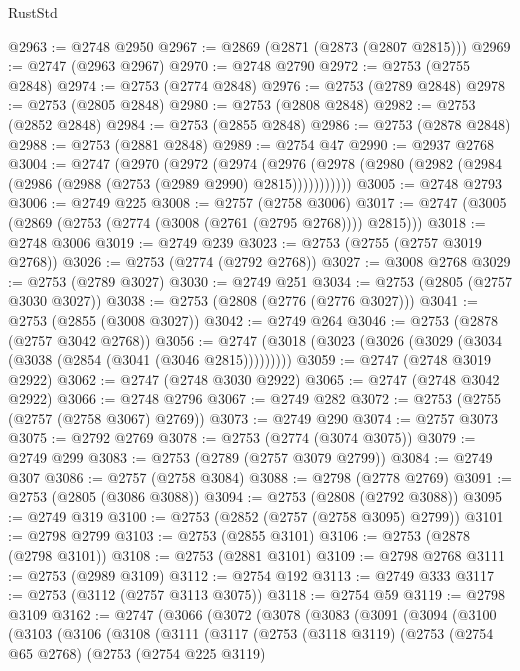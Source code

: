 \begin{lexlean}{RustStd}
\begin{coremodule}
{\begin{coremodule}
{{{{{{{{{{{{{{{{{{{{{{{{{{{{{{{{{@2963 := @2748 @2950
@2967 := @2869 (@2871 (@2873 (@2807 @2815)))
@2969 := @2747 (@2963 @2967)
@2970 := @2748 @2790
@2972 := @2753 (@2755 @2848)
@2974 := @2753 (@2774 @2848)
@2976 := @2753 (@2789 @2848)
@2978 := @2753 (@2805 @2848)
@2980 := @2753 (@2808 @2848)
@2982 := @2753 (@2852 @2848)
@2984 := @2753 (@2855 @2848)
@2986 := @2753 (@2878 @2848)
@2988 := @2753 (@2881 @2848)
@2989 := @2754 @47
@2990 := @2937 @2768
@3004 := @2747
    (@2970
      (@2972
        (@2974
          (@2976 (@2978 (@2980 (@2982 (@2984 (@2986 (@2988 (@2753 (@2989 @2990) @2815)))))))))))
@3005 := @2748 @2793
@3006 := @2749 @225
@3008 := @2757 (@2758 @3006)
@3017 := @2747 (@3005 (@2869 (@2753 (@2774 (@3008 (@2761 (@2795 @2768)))) @2815)))
@3018 := @2748 @3006
@3019 := @2749 @239
@3023 := @2753 (@2755 (@2757 @3019 @2768))
@3026 := @2753 (@2774 (@2792 @2768))
@3027 := @3008 @2768
@3029 := @2753 (@2789 @3027)
@3030 := @2749 @251
@3034 := @2753 (@2805 (@2757 @3030 @3027))
@3038 := @2753 (@2808 (@2776 (@2776 @3027)))
@3041 := @2753 (@2855 (@3008 @3027))
@3042 := @2749 @264
@3046 := @2753 (@2878 (@2757 @3042 @2768))
@3056 := @2747 (@3018 (@3023 (@3026 (@3029 (@3034 (@3038 (@2854 (@3041 (@3046 @2815)))))))))
@3059 := @2747 (@2748 @3019 @2922)
@3062 := @2747 (@2748 @3030 @2922)
@3065 := @2747 (@2748 @3042 @2922)
@3066 := @2748 @2796
@3067 := @2749 @282
@3072 := @2753 (@2755 (@2757 (@2758 @3067) @2769))
@3073 := @2749 @290
@3074 := @2757 @3073
@3075 := @2792 @2769
@3078 := @2753 (@2774 (@3074 @3075))
@3079 := @2749 @299
@3083 := @2753 (@2789 (@2757 @3079 @2799))
@3084 := @2749 @307
@3086 := @2757 (@2758 @3084)
@3088 := @2798 (@2778 @2769)
@3091 := @2753 (@2805 (@3086 @3088))
@3094 := @2753 (@2808 (@2792 @3088))
@3095 := @2749 @319
@3100 := @2753 (@2852 (@2757 (@2758 @3095) @2799))
@3101 := @2798 @2799
@3103 := @2753 (@2855 @3101)
@3106 := @2753 (@2878 (@2798 @3101))
@3108 := @2753 (@2881 @3101)
@3109 := @2798 @2768
@3111 := @2753 (@2989 @3109)
@3112 := @2754 @192
@3113 := @2749 @333
@3117 := @2753 (@3112 (@2757 @3113 @3075))
@3118 := @2754 @59
@3119 := @2798 @3109
@3162 := @2747
    (@3066
      (@3072
        (@3078
          (@3083
            (@3091
              (@3094
                (@3100
                  (@3103
                    (@3106
                      (@3108
                        (@3111
                          (@3117
                            (@2753
                              (@3118 @3119)
                              (@2753
                                (@2754 @65 @2768)
                                (@2753
                                  (@2754 @225 @3119)
}}}}}}}}}}}}}}}}}}}}}}}}}}}}}}}}}
\end{coremodule}}
\end{coremodule}
\end{lexlean}
